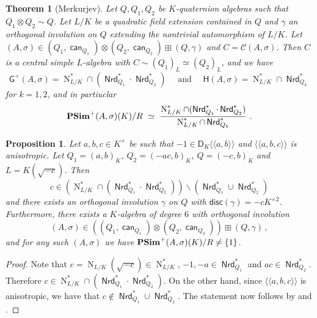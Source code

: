 \documentclass[10pt,a4paper]{amsart}
\newtheorem{prop}{Proposition}
\newtheorem{thm}{Theorem}
\newcommand{\Cl}{\mc{C}}
\newcommand{\D}{\mathsf{D}}
\newcommand{\G}{\mathsf{G}}
\renewcommand{\H}{\mathsf{H}}
\newcommand\N{\operatorname{N}}
\newcommand\Nrd{\operatorname{\mathsf{Nrd}}}
\newcommand{\can}{\operatorname{\mathsf{can}}}
\newcommand{\disc}{\mathsf{disc}}
\newcommand\ind{\operatorname{\mathsf{ind}}}
\newcommand{\la}{\langle}
\newcommand{\lla}{\la\!\la}
\newcommand{\mc}{\mathcal}
\newcommand{\mg}[1]{{#1}^{\times}}
\newcommand{\ra}{\rangle}
\newcommand{\rra}{\ra\!\ra}
\newcommand{\s}{\sigma}
\renewcommand{\setminus}{\smallsetminus}
\newcommand{\sq}[1]{{#1}^{\times 2}}
\begin{document}
\begin{thm}[Merkurjev] 
\label{T:MerkProp9}
    Let $Q,Q_1,Q_2$ be $K$-quaternion  algebras such that $Q_1\otimes Q_2\sim Q$.
    Let $L/K$ be a quadratic field extension contained in $Q$ and $\gamma$ an orthogonal involution on $Q$ extending the nontrivial automorphism of $L/K$.
    Let $(A,\s)\in (Q_1,\can_{Q_1})\otimes (Q_2,\can_{Q_2})\boxplus (Q,\gamma)$ and $C=\Cl(A,\s)$.
    Then $C$ is a central simple $L$-algebra
with $C\sim (Q_1)_L\simeq (Q_2)_L$, and we have 
$$\G^+(A,\s)  = \N_{L/K}^\ast\cap(\Nrd_{Q_1}^\ast\cdot \Nrd_{Q_2}^\ast) \quad\mbox{ and }\quad
\H(A,\s) = \N^\ast_{L/K}\cap \Nrd^\ast_{Q_k}$$
for $k=1,2$, and in partiuclar
    $${\bf PSim}^+(A,\s)(K)/R\,\,\simeq \,\,\dfrac{\N_{L/K}^\ast\cap(\Nrd_{Q_1}^\ast\cdot \Nrd_{Q_2}^\ast)}{\N^\ast_{L/K}\cap \Nrd^\ast_{Q_k}}\,\,.$$
\end{thm}

\begin{prop}\label{P:3-Pfister-A3-example}
    Let $a,b,c\in\mg{K}$ be such that $-1\in\D_K{\lla a,b\rra}$ and
    $\lla a,b,c\rra$ is anisotropic.
Let $Q_1=(a,b)_K$, $Q_2=(-ac,b)_K$, $Q=(-c,b)_K$ and $L=K(\sqrt{-c})$. 
 Then $$c\in\left(\N_{L/K}^\ast\cap(\Nrd_{Q_1}^\ast\cdot \Nrd_{Q_2}^\ast)\right)\setminus (\Nrd_{Q_1}^\ast\cup\Nrd_{Q_2}^\ast)$$
and there exists an orthogonal involution $\gamma$ on $Q$ with $\disc(\gamma)=-c\sq{K}$.
Furthermore, there exists a $K$-algebra of degree $6$ with orthogonal involution $$(A,\s)\in \left((Q_1,\can_{Q_1})\otimes (Q_2,\can_{Q_2})\right)\boxplus (Q,\gamma)\,,$$ and for any such $(A,\s)$ we have ${\bf PSim}^+(A,\s)(K)/R\neq \{1\}$.
\end{prop}

\begin{proof}
Note that $c=\N_{L/K}(\sqrt{-c})\in\N_{L/K}^\ast$, $-1,-a\in \Nrd_{Q_1}^\ast$ and $ac\in \Nrd_{Q_2}^\ast$. 
Therefore $c\in\N_{L/K}^\ast\cap (\Nrd_{Q_1}^\ast\cdot\Nrd_{Q_2}^\ast)$.
On the other hand, since $\lla a,b,c \rra$ is anisotropic, we have that $c\notin\Nrd_{Q_1}^\ast\cup\Nrd_{Q_2}^\ast$.
The statement now follows by  and .
\end{proof}
\end{document}
